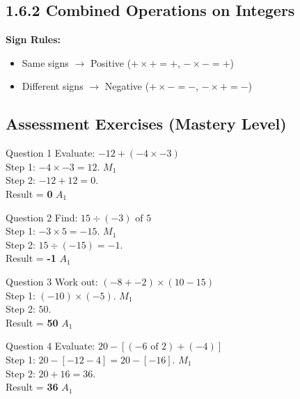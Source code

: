 \documentclass[12pt, a4paper, oneside]{article}
\begin{document}
\subsection*{1.6.2 Combined Operations on Integers}

\begin{tcolorbox}[colback=lightgrey, colframe=primaryblue, title=\textbf{Concept Summary}, arc=5pt]
    \textbf{Sign Rules:}
    \begin{itemize}
        \item Same signs $\rightarrow$ Positive ($+ \times + = +$, $- \times - = +$)
        \item Different signs $\rightarrow$ Negative ($+ \times - = -$, $- \times + = -$)
    \end{itemize}
\end{tcolorbox}

\subsection*{Assessment Exercises (Mastery Level)}

\begin{solvingbox}{Question 1}
Evaluate: $-12 + (-4 \times -3)$ \\
Step 1: $-4 \times -3 = 12$. \hfill $M_1$ \\
Step 2: $-12 + 12 = 0$. \\
Result = \textbf{0} \hfill $A_1$
\end{solvingbox}

\begin{solvingbox}{Question 2}
Find: $15 \div (-3) \text{ of } 5$ \\
Step 1: $-3 \times 5 = -15$. \hfill $M_1$ \\
Step 2: $15 \div (-15) = -1$. \\
Result = \textbf{-1} \hfill $A_1$
\end{solvingbox}

\begin{solvingbox}{Question 3}
Work out: $(-8 + -2) \times (10 - 15)$ \\
Step 1: $(-10) \times (-5)$. \hfill $M_1$ \\
Step 2: $50$. \\
Result = \textbf{50} \hfill $A_1$
\end{solvingbox}

\begin{solvingbox}{Question 4}
Evaluate: $20 - [(-6 \text{ of } 2) + (-4)]$ \\
Step 1: $20 - [-12 - 4] = 20 - [-16]$. \hfill $M_1$ \\
Step 2: $20 + 16 = 36$. \\
Result = \textbf{36} \hfill $A_1$
\end{solvingbox}
\end{document}
